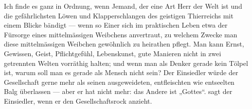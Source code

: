 Ich finde es ganz in Ordnung, wenn Jemand, der eine Art Herr der Welt ist und die gefährlichsten Löwen und Klapperschlangen des geistigen Thierreichs mit einem Blicke bändigt — wenn so Einer sich im praktischen Leben etwa der Fürsorge eines mittelmässigen Weibchens anvertraut, zu welchem Zwecke man diese mittelmässigen Weibchen gewöhnlich zu heirathen pflegt. Man kann Ernst, Gewissen, Geist, Pflichtgefühl, Lebenskunst, gute Manieren nicht in zwei getrennten Welten vorräthig halten; und wenn man als Denker gerade kein Tölpel ist, warum soll man es gerade als Mensch nicht sein? Der Einsiedler würde der Gesellschaft gerne mehr als seinen ausgeweideten, entfleischten wie entseelten Balg überlassen — aber er hat nicht mehr: das Andere ist „Gottes“.  sagt der Einsiedler, wenn er den Gesellschaftsrock anzieht.
\par

